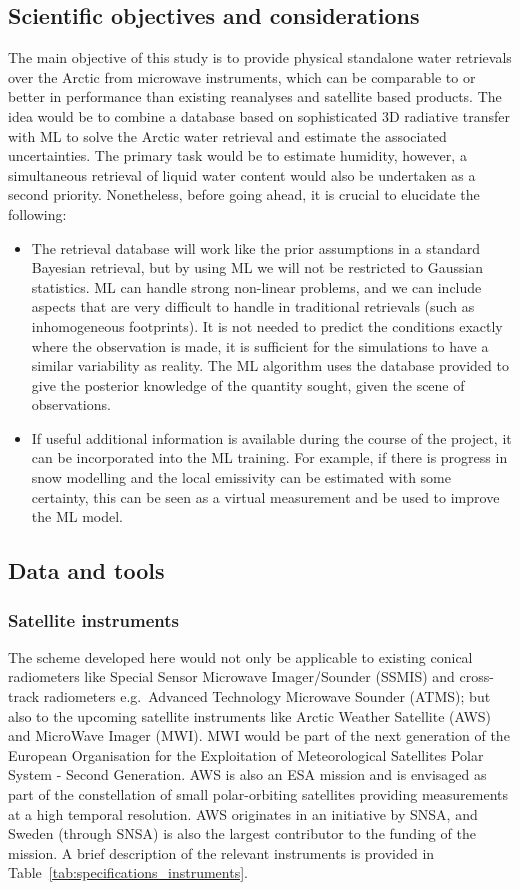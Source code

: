 \documentclass[12pt,oneside,a4paper]{article}
\begin{document}
\subsection{Scientific objectives and considerations}
The main objective of this study is to provide physical standalone water retrievals over the Arctic from microwave instruments, which can be comparable to or better in performance than existing reanalyses and satellite based products. The idea would be to combine a database based on sophisticated 3D radiative transfer with ML to solve the Arctic water retrieval and estimate the associated uncertainties. The primary task would be to estimate humidity, however, a simultaneous retrieval of liquid water content would also be undertaken as a second priority.
Nonetheless, before going ahead, it is crucial to elucidate the following:
\begin{itemize}
\item  The retrieval database will work like the prior assumptions in a standard Bayesian retrieval, but by using ML we will not be restricted to Gaussian statistics. ML can handle strong non-linear problems, and we can include aspects that are very difficult to handle in traditional retrievals (such as inhomogeneous footprints). It is not needed to predict the conditions exactly where the observation is made, it is sufficient for the simulations to have a similar variability as reality. The ML algorithm uses the database provided to give the posterior knowledge of the quantity sought, given the scene of observations.
\item  If useful additional information is available during the course of the project, it can be incorporated into the ML training. For example, if there is progress in snow modelling and the local emissivity can be estimated with some certainty, this can be seen as a virtual measurement and be used to improve the ML model. 
\end{itemize}

\subsection{Data and tools}
% 
\subsubsection{Satellite instruments}

The scheme developed here would not only be applicable to existing conical radiometers like  Special Sensor Microwave Imager/Sounder (SSMIS) and cross-track radiometers e.g.\, Advanced Technology Microwave Sounder (ATMS); but also to the upcoming satellite instruments like Arctic Weather Satellite (AWS) and MicroWave Imager (MWI). MWI would be part of the next generation of the European Organisation for the Exploitation of Meteorological Satellites Polar System - Second Generation. AWS is also an ESA mission and is envisaged as part of the constellation of small polar-orbiting satellites providing measurements at a high temporal resolution. AWS originates in an initiative by SNSA, and Sweden (through SNSA) is also the largest contributor to the funding of the mission. A brief description of the relevant instruments is provided in Table~\ref{tab:specifications_instruments}. 
\end{document}
